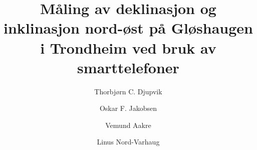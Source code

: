 
\title{Måling av deklinasjon og inklinasjon nord-øst på Gløshaugen i Trondheim ved bruk av smarttelefoner}
\author[1]{Thorbjørn C. Djupvik}
\author[1]{Oskar F. Jakobsen}
\author[1]{Vemund Aakre}
\author[1]{Linus Nord-Varhaug}


\maketitle
